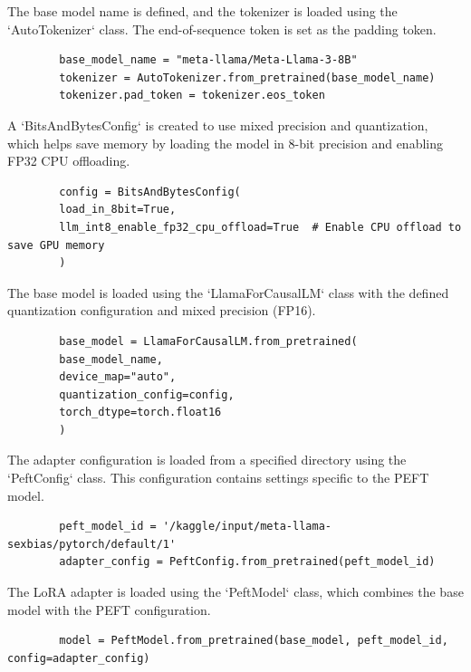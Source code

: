 \documentclass{solutionclass} %
\begin{document}
\begin{solution}
	The base model name is defined, and the tokenizer is loaded using the `AutoTokenizer` class. The end-of-sequence token is set as the padding token.
	\begin{lstlisting}
		base_model_name = "meta-llama/Meta-Llama-3-8B"
		tokenizer = AutoTokenizer.from_pretrained(base_model_name)
		tokenizer.pad_token = tokenizer.eos_token
	\end{lstlisting}
\end{solution}

\begin{solution}
	A `BitsAndBytesConfig` is created to use mixed precision and quantization, which helps save memory by loading the model in 8-bit precision and enabling FP32 CPU offloading.
	\begin{lstlisting}
		config = BitsAndBytesConfig(
		load_in_8bit=True,
		llm_int8_enable_fp32_cpu_offload=True  # Enable CPU offload to save GPU memory
		)
	\end{lstlisting}
\end{solution}

\begin{solution}
	The base model is loaded using the `LlamaForCausalLM` class with the defined quantization configuration and mixed precision (FP16).
	\begin{lstlisting}
		base_model = LlamaForCausalLM.from_pretrained(
		base_model_name,
		device_map="auto",
		quantization_config=config,
		torch_dtype=torch.float16
		)
	\end{lstlisting}
\end{solution}

\begin{solution}
	The adapter configuration is loaded from a specified directory using the `PeftConfig` class. This configuration contains settings specific to the PEFT model.
	\begin{lstlisting}
		peft_model_id = '/kaggle/input/meta-llama-sexbias/pytorch/default/1'
		adapter_config = PeftConfig.from_pretrained(peft_model_id)
	\end{lstlisting}
\end{solution}

\begin{solution}
	The LoRA adapter is loaded using the `PeftModel` class, which combines the base model with the PEFT configuration.
	\begin{lstlisting}
		model = PeftModel.from_pretrained(base_model, peft_model_id, config=adapter_config)
	\end{lstlisting}
\end{solution}
\end{document}
